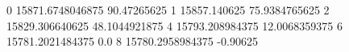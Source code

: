 0 15871.6748046875 90.47265625
1 15857.140625 75.9384765625
2 15829.306640625 48.1044921875
4 15793.208984375 12.0068359375
6 15781.2021484375 0.0
8 15780.2958984375 -0.90625
